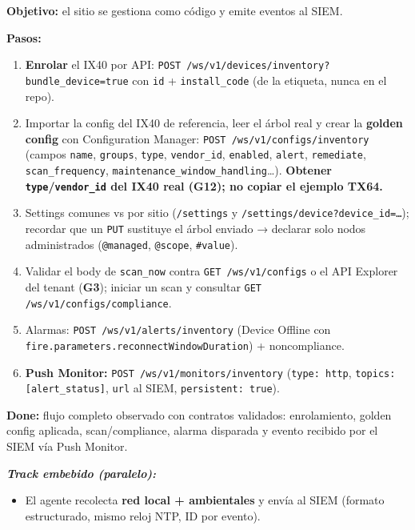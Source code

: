 \documentclass[11pt,a4paper]{article}
\newcommand{\file}[1]{\texttt{#1}}
\newcommand{\gate}[1]{\textbf{G#1}}
\newcommand{\done}{\textbf{Done:}}
\newcommand{\embebido}{\textit{Track embebido (paralelo):}}
\begin{document}
\textbf{Objetivo:} el sitio se gestiona como código y emite eventos al SIEM.

\textbf{Pasos:}
\begin{enumerate}
  \item \textbf{Enrolar} el IX40 por API:
        \file{POST /ws/v1/devices/inventory?bundle\_device=true} con \file{id} +
        \file{install\_code} (de la etiqueta, nunca en el repo).
  \item Importar la config del IX40 de referencia, leer el árbol real y crear la
        \textbf{golden config} con Configuration Manager:
        \file{POST /ws/v1/configs/inventory}
        (campos \file{name}, \file{groups}, \file{type}, \file{vendor\_id}, \file{enabled},
        \file{alert}, \file{remediate}, \file{scan\_frequency},
        \file{maintenance\_window\_handling}…). \textbf{Obtener \file{type}/\file{vendor\_id} del
        IX40 real (\gate{12}); no copiar el ejemplo TX64.}
  \item Settings comunes vs por sitio (\file{/settings} y
        \file{/settings/device?device\_id=…}); recordar que un \file{PUT} sustituye el árbol
        enviado → declarar solo nodos administrados (\file{@managed}, \file{@scope},
        \file{\#value}).
  \item Validar el body de \file{scan\_now} contra \file{GET /ws/v1/configs} o el API Explorer
        del tenant (\textbf{\gate{3}}); iniciar un scan y consultar
        \file{GET /ws/v1/configs/compliance}.
  \item Alarmas: \file{POST /ws/v1/alerts/inventory} (Device Offline con
        \file{fire.parameters.reconnectWindowDuration}) + noncompliance.
  \item \textbf{Push Monitor:} \file{POST /ws/v1/monitors/inventory}
        (\file{type: http}, \file{topics: [alert\_status]}, \file{url} al SIEM,
        \file{persistent: true}).
\end{enumerate}

\begin{clave}
\small
\done{} flujo completo observado con contratos validados: enrolamiento, golden config aplicada,
scan/compliance, alarma disparada y evento recibido por el SIEM vía Push Monitor.
\end{clave}

\textbf{\embebido}
\begin{itemize}
  \item El agente recolecta \textbf{red local + ambientales} y envía al SIEM
        (formato estructurado, mismo reloj NTP, ID por evento).
\end{itemize}
\end{document}
